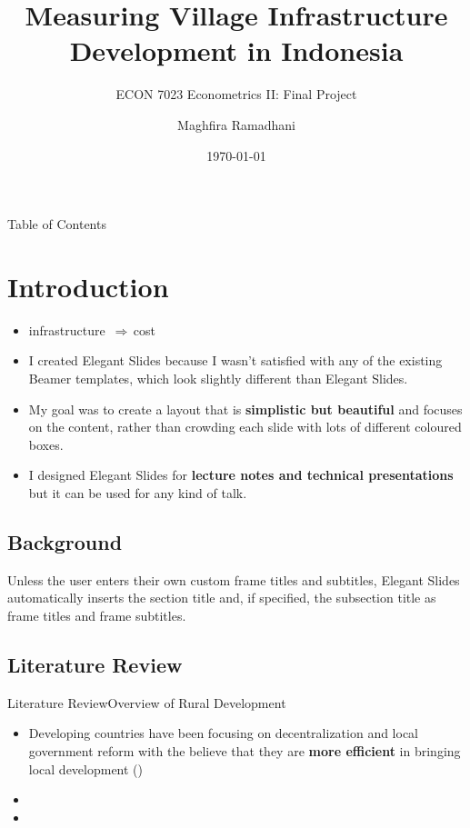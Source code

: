 \documentclass[
11pt,notheorems,hyperref={pdfauthor=Maghfira Ramadhani}
]{beamer}
\title[
]{Measuring Village Infrastructure Development in Indonesia}
\subtitle{ECON 7023 Econometrics II: Final Project}
\author[
]{
    Maghfira Ramadhani 
}
\institute{
    School of Economics, \\
    Georgia Institute of Technology}
\date{\today}
\def\up{\textuparrow\,}
\def\so{{$\Rightarrow\,$}}
\newcommand{\al}[1]{\textbf{\alert{#1}}}
\begin{document}
{
\begin{frame}
  \titlepage
\end{frame}
}
\addtocounter{framenumber}{-1}

\begin{frame}{Table of Contents}
    \tableofcontents%
\end{frame}


\section{Introduction}
\begin{frame}
\begin{itemize}
    \item infrastructure \up \so cost \up \citeauthor{hartojo_2022}
    \item I created Elegant Slides because I wasn't satisfied with any of the existing Beamer templates, which look slightly different than Elegant Slides.
    \item My goal was to create a layout that is \al{simplistic but beautiful} and focuses on the content, rather than crowding each slide with lots of different coloured boxes.
    \item I designed Elegant Slides for \al{lecture notes and technical presentations} but it can be used for any kind of talk. 
\end{itemize}
\end{frame}

\subsection{Background}
\begin{frame}
    Unless the user enters their own custom frame titles and subtitles, Elegant Slides automatically inserts the section title and, if specified, the subsection title as frame titles and frame subtitles.
\end{frame}

\subsection{Literature Review}
\begin{frame}{Literature Review}{Overview of Rural Development}
\begin{itemize}
    \item Developing countries have been focusing on decentralization and local government reform with the believe that they are \alert{\textbf{more efficient}} in bringing local development (\cite{vazquez_2017}) 
    \item 
    \item 
\end{itemize}
\end{frame}
\end{document}
